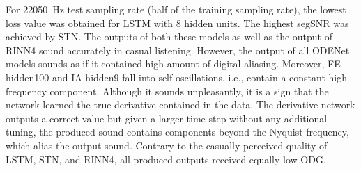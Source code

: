 For \SI{22050}{Hz} test sampling rate (half of the training sampling rate), the lowest loss value was obtained for \ac{LSTM} with 8 hidden units. The highest \ac{segSNR} was achieved by \ac{STN}. The outputs of both these models as well as the output of \ac{RINN}4 sound accurately in casual listening. However, the output of all ODENet models sounds as if it contained high amount of digital aliasing. Moreover, FE hidden100 and IA hidden9 fall into self-oscillations, i.e., contain a constant high-frequency component. Although it sounds unpleasantly, it is a sign that the network learned the true derivative contained in the data. The derivative network outputs a correct value but given a larger time step without any additional tuning, the produced sound contains components beyond the Nyquist frequency, which alias the output sound. Contrary to the casually perceived quality of \ac{LSTM}, \ac{STN}, and \ac{RINN}4, all produced outputs received equally low \ac{ODG}. 
